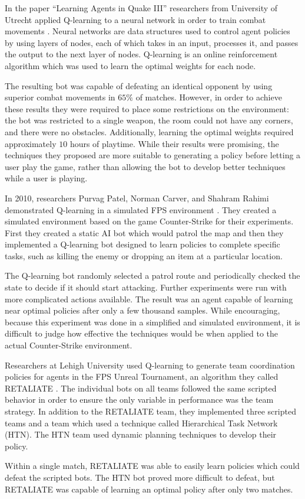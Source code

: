 In the paper ``Learning Agents in Quake III'' researchers from University of Utrecht applied Q-learning to a neural network in order to train combat movements \cite{q3combat}. Neural networks are data structures used to control agent policies by using layers of nodes, each of which takes in an input, processes it, and passes the output to the next layer of nodes. Q-learning is an online reinforcement algorithm which was used to learn the optimal weights for each node.

The resulting bot was capable of defeating an identical opponent by using superior combat movements in $65\%$ of matches. However, in order to achieve these results they were required to place some restrictions on the environment: the bot was restricted to a single weapon, the room could not have any corners, and there were no obstacles. Additionally, learning the optimal weights required approximately $10$ hours of playtime. While their results were promising, the techniques they proposed are more suitable to generating a policy before letting a user play the game, rather than allowing the bot to develop better techniques while a user is playing.

In 2010, researchers Purvag Patel, Norman Carver, and Shahram Rahimi demonstrated Q-learning in a simulated FPS environment \cite{game:ai:learning}. They created a simulated environment based on the game Counter-Strike for their experiments. First they created a static AI bot which would patrol the map and then they implemented a Q-learning bot designed to learn policies to complete specific tasks, such as killing the enemy or dropping an item at a particular location.

The Q-learning bot randomly selected a patrol route and periodically checked the state to decide if it should start attacking. Further experiments were run with more complicated actions available. The result was an agent capable of learning near optimal policies after only a few thousand samples. While encouraging, because this experiment was done in a simplified and simulated environment, it is difficult to judge how effective the techniques would be when applied to the actual Counter-Strike environment.

Researchers at Lehigh University used Q-learning to generate team coordination policies for agents in the FPS Unreal Tournament, an algorithm they called RETALIATE \cite{retaliate}. The individual bots on all teams followed the same scripted behavior in order to ensure the only variable in performance was the team strategy. In addition to the RETALIATE team, they implemented three scripted teams and a team which used a technique called Hierarchical Task Network (HTN). The HTN team used dynamic planning techniques to develop their policy.

Within a single match, RETALIATE was able to easily learn policies which could defeat the scripted bots. The HTN bot proved more difficult to defeat, but RETALIATE was capable of learning an optimal policy after only two matches.